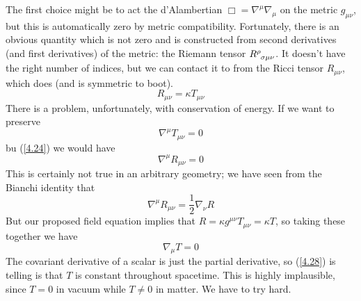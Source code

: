 The first choice might be to act the d'Alambertian $\Box =\nabla^\mu \nabla_\mu$ on the metric $g_{\mu\nu}$, but this is automatically zero by metric compatibility. Fortunately, there is an obvious quantity which is not zero and is constructed from second derivatives (and first derivatives) of the metric: the Riemann tensor $\tensor{R}{^\rho_{\sigma\mu\nu}}$. It doesn't have the right number of indices, but we can contact it to from the Ricci tensor $R_{\mu\nu}$, which does (and is symmetric to boot).
\begin{equation}\label{4.24}
    R_{\mu\nu}=\kappa T_{\mu\nu}
\end{equation}
There is a problem, unfortunately, with conservation of energy. If we want to preserve
\begin{equation*}
    \nabla^\mu T_{\mu\nu}=0
\end{equation*}
bu (\ref{4.24}) we would have
\begin{equation*}
    \nabla^\mu R_{\mu\nu}=0
\end{equation*}
This is certainly not true in an arbitrary geometry; we have seen from the Bianchi identity that
\begin{equation*}
    \nabla^\mu R_{\mu\nu}=\frac{1}{2}\nabla_\nu R
\end{equation*}
But our proposed field equation implies that $R=\kappa g^{\mu\nu}T_{\mu\nu}=\kappa T$, so taking these together we have
\begin{equation}\label{4.28}
    \nabla_\mu T=0
\end{equation}
The covariant derivative of a scalar is just the partial derivative, so (\ref{4.28}) is telling is that $T$ is constant throughout spacetime. This is highly implausible, since $T=0$ in vacuum while $T\neq 0$ in matter. We have to try hard.

